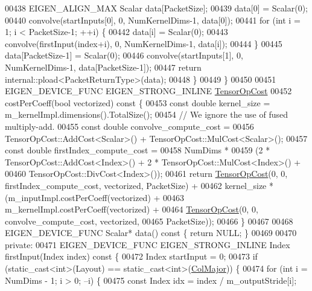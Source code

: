 \begin{DoxyCode}
00438       EIGEN\_ALIGN\_MAX Scalar data[PacketSize];
00439       data[0] = Scalar(0);
00440       convolve(startInputs[0], 0, NumKernelDims-1, data[0]);
00441       \textcolor{keywordflow}{for} (\textcolor{keywordtype}{int} i = 1; i < PacketSize-1; ++i) \{
00442         data[i] = Scalar(0);
00443         convolve(firstInput(index+i), 0, NumKernelDims-1, data[i]);
00444       \}
00445       data[PacketSize-1] = Scalar(0);
00446       convolve(startInputs[1], 0, NumKernelDims-1, data[PacketSize-1]);
00447       \textcolor{keywordflow}{return} internal::pload<PacketReturnType>(data);
00448     \}
00449   \}
00450 
00451   EIGEN\_DEVICE\_FUNC EIGEN\_STRONG\_INLINE \hyperlink{class_eigen_1_1_tensor_op_cost}{TensorOpCost}
00452   costPerCoeff(\textcolor{keywordtype}{bool} vectorized)\textcolor{keyword}{ const }\{
00453     \textcolor{keyword}{const} \textcolor{keywordtype}{double} kernel\_size = m\_kernelImpl.dimensions().TotalSize();
00454     \textcolor{comment}{// We ignore the use of fused multiply-add.}
00455     \textcolor{keyword}{const} \textcolor{keywordtype}{double} convolve\_compute\_cost =
00456         TensorOpCost::AddCost<Scalar>() + TensorOpCost::MulCost<Scalar>();
00457     \textcolor{keyword}{const} \textcolor{keywordtype}{double} firstIndex\_compute\_cost =
00458         NumDims *
00459         (2 * TensorOpCost::AddCost<Index>() + 2 * TensorOpCost::MulCost<Index>() +
00460          TensorOpCost::DivCost<Index>());
00461     \textcolor{keywordflow}{return} \hyperlink{class_eigen_1_1_tensor_op_cost}{TensorOpCost}(0, 0, firstIndex\_compute\_cost, vectorized, PacketSize) +
00462            kernel\_size * (m\_inputImpl.costPerCoeff(vectorized) +
00463                           m\_kernelImpl.costPerCoeff(vectorized) +
00464                           \hyperlink{class_eigen_1_1_tensor_op_cost}{TensorOpCost}(0, 0, convolve\_compute\_cost, vectorized,
00465                                        PacketSize));
00466   \}
00467 
00468   EIGEN\_DEVICE\_FUNC Scalar* data()\textcolor{keyword}{ const }\{ \textcolor{keywordflow}{return} NULL; \}
00469 
00470  \textcolor{keyword}{private}:
00471   EIGEN\_DEVICE\_FUNC EIGEN\_STRONG\_INLINE Index firstInput(Index index)\textcolor{keyword}{ const }\{
00472     Index startInput = 0;
00473     \textcolor{keywordflow}{if} (static\_cast<int>(Layout) == static\_cast<int>(\hyperlink{group__enums_ggaacded1a18ae58b0f554751f6cdf9eb13a0cbd4bdd0abcfc0224c5fcb5e4f6669a}{ColMajor})) \{
00474       \textcolor{keywordflow}{for} (\textcolor{keywordtype}{int} i = NumDims - 1; i > 0; --i) \{
00475         \textcolor{keyword}{const} Index idx = index / m\_outputStride[i];

\end{DoxyCode}
